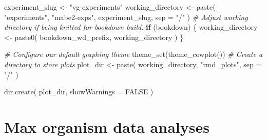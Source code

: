 \documentclass[
]{book}
\newenvironment{Shaded}{\begin{snugshade}}{\end{snugshade}}
\newcommand{\AttributeTok}[1]{\textcolor[rgb]{0.77,0.63,0.00}{#1}}
\newcommand{\CommentTok}[1]{\textcolor[rgb]{0.56,0.35,0.01}{\textit{#1}}}
\newcommand{\ConstantTok}[1]{\textcolor[rgb]{0.00,0.00,0.00}{#1}}
\newcommand{\ControlFlowTok}[1]{\textcolor[rgb]{0.13,0.29,0.53}{\textbf{#1}}}
\newcommand{\FunctionTok}[1]{\textcolor[rgb]{0.00,0.00,0.00}{#1}}
\newcommand{\NormalTok}[1]{#1}
\newcommand{\OtherTok}[1]{\textcolor[rgb]{0.56,0.35,0.01}{#1}}
\newcommand{\StringTok}[1]{\textcolor[rgb]{0.31,0.60,0.02}{#1}}
\begin{document}
\begin{Shaded}
\begin{Highlighting}[]
\NormalTok{experiment\_slug }\OtherTok{\textless{}{-}} \StringTok{"vg{-}experiments"}
\NormalTok{working\_directory }\OtherTok{\textless{}{-}} \FunctionTok{paste}\NormalTok{(}
  \StringTok{"experiments"}\NormalTok{,}
  \StringTok{"mabe2{-}exps"}\NormalTok{,}
\NormalTok{  experiment\_slug,}
  \AttributeTok{sep =} \StringTok{"/"}
\NormalTok{)}
\CommentTok{\# Adjust working directory if being knitted for bookdown build.}
\ControlFlowTok{if}\NormalTok{ (bookdown) \{}
\NormalTok{  working\_directory }\OtherTok{\textless{}{-}} \FunctionTok{paste0}\NormalTok{(}
\NormalTok{    bookdown\_wd\_prefix,}
\NormalTok{    working\_directory}
\NormalTok{  )}
\NormalTok{\}}
\end{Highlighting}
\end{Shaded}

\begin{Shaded}
\begin{Highlighting}[]
\CommentTok{\# Configure our default graphing theme}
\FunctionTok{theme\_set}\NormalTok{(}\FunctionTok{theme\_cowplot}\NormalTok{())}
\CommentTok{\# Create a directory to store plots}
\NormalTok{plot\_dir }\OtherTok{\textless{}{-}} \FunctionTok{paste}\NormalTok{(}
\NormalTok{  working\_directory,}
  \StringTok{"rmd\_plots"}\NormalTok{,}
  \AttributeTok{sep =} \StringTok{"/"}
\NormalTok{)}

\FunctionTok{dir.create}\NormalTok{(}
\NormalTok{  plot\_dir,}
  \AttributeTok{showWarnings =} \ConstantTok{FALSE}
\NormalTok{)}
\end{Highlighting}
\end{Shaded}

\hypertarget{max-organism-data-analyses}{%
\section{Max organism data analyses}\label{max-organism-data-analyses}}
\end{document}

